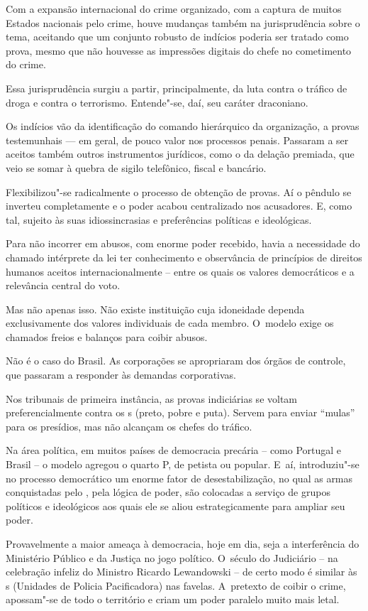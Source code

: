 Com a expansão internacional do crime organizado, com a captura de
muitos Estados nacionais pelo crime, houve mudanças também na
jurisprudência sobre o tema, aceitando que um conjunto robusto de
indícios poderia ser tratado como prova, mesmo que não houvesse as
impressões digitais do chefe no cometimento do crime.

Essa jurisprudência surgiu a partir, principalmente, da luta contra o
tráfico de droga e contra o terrorismo. Entende"-se, daí, seu caráter
draconiano.

Os indícios vão da identificação do comando hierárquico da organização,
a provas testemunhais --- em geral, de pouco valor nos processos penais.
Passaram a ser aceitos também outros instrumentos jurídicos, como o da
delação premiada, que veio se somar à quebra de sigilo telefônico,
fiscal e bancário.

Flexibilizou"-se radicalmente o processo de obtenção de provas. Aí o
pêndulo se inverteu completamente e o poder acabou centralizado nos
acusadores. E, como tal, sujeito às suas idiossincrasias e preferências
políticas e ideológicas.

Para não incorrer em abusos, com enorme poder recebido, havia a
necessidade do chamado intérprete da lei ter conhecimento e observância
de princípios de direitos humanos aceitos internacionalmente -- entre os
quais os valores democráticos e a relevância central do voto.

Mas não apenas isso. Não existe instituição cuja idoneidade dependa
exclusivamente dos valores individuais de cada membro. O~modelo exige os
chamados freios e balanços para coibir abusos.

Não é o caso do Brasil. As corporações se apropriaram dos órgãos de
controle, que passaram a responder às demandas corporativas.

Nos tribunais de primeira instância, as provas indiciárias se voltam
preferencialmente contra os s (preto, pobre e puta). Servem para
enviar ``mulas'' para os presídios, mas não alcançam os chefes do
tráfico.

Na área política, em muitos países de democracia precária -- como
Portugal e Brasil -- o modelo agregou o quarto P, de petista ou popular.
E~aí, introduziu"-se no processo democrático um enorme fator de
desestabilização, no qual as armas conquistadas pelo , pela lógica de
poder, são colocadas a serviço de grupos políticos e ideológicos aos
quais ele se aliou estrategicamente para ampliar seu poder.

Provavelmente a maior ameaça à democracia, hoje em dia, seja a
interferência do Ministério Público e da Justiça no jogo político. O~século do Judiciário -- na celebração infeliz do Ministro Ricardo
Lewandowski -- de certo modo é similar às s (Unidades de Policia
Pacificadora) nas favelas. A~pretexto de coibir o crime, apossam"-se de
todo o território e criam um poder paralelo muito mais letal.

